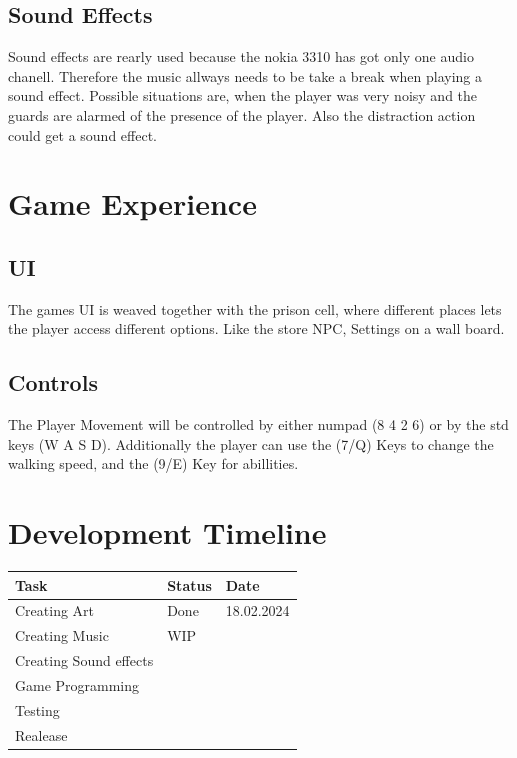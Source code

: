 \documentclass[12pt, a4paper]{article}
\begin{document}
{        \subsection{Sound Effects}
            Sound effects are rearly used because the nokia 3310
            has got only one audio chanell. Therefore the music 
            allways needs to be take a break when playing a sound
            effect. Possible situations are, when the player was very noisy
            and the guards are alarmed of the presence of the player. Also
            the distraction action could get a sound effect.

    \section{Game Experience}
    
        \subsection{UI}
            The games UI is weaved together with the prison cell,
            where different places lets the player access different
            options. Like the store NPC, Settings on a wall board.
            
        \subsection{Controls}
            The Player Movement will be controlled by either numpad (8 4 2 6)
            or by the std keys (W A S D). Additionally the player can use the (7/Q)
            Keys to change the walking speed, and the (9/E) Key for abillities.

    \section{Development Timeline}
        \begin{table}[h]
            \centering
            \begin{tabular}{| m{4cm} | m{4cm} | m{4cm}|}\hline
                \textbf{Task} & \textbf{Status} & \textbf{Date}\\\hline\hline
                Creating Art & Done & 18.02.2024\\\hline
                Creating Music & WIP & \\\hline
                Creating Sound effects &  &\\\hline
                Game Programming &  & \\\hline
                Testing & & \\\hline
                Realease & & \\\hline
            \end{tabular}
        \end{table}
}
\end{document}
